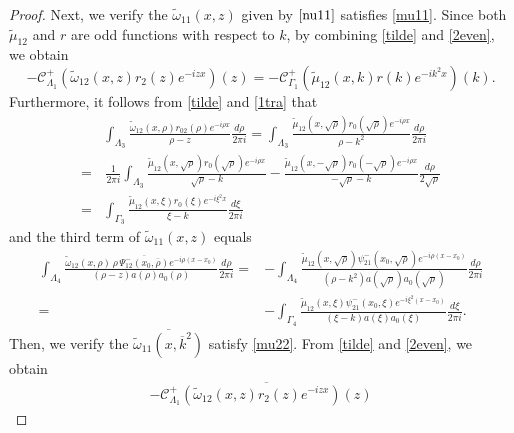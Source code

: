 \documentclass[preprint,compress,12pt]{elsarticle}
\numberwithin{equation}{section}
\begin{document}
\begin{proof}
Next, we verify the $\tilde{\omega}_{11}(x,z)$ given by $\eqref{nu11}$ satisfies \eqref{mu11}. Since both $\tilde{\mu}_{12}$ and $r$ are odd functions with respect to $k$, by combining \eqref{tilde} and \eqref{2even}, we obtain
\begin{equation*}
-\mathcal{C}_{\Lambda_{1}}^{+}\left(\tilde{\omega}_{12}(x,z)r_{2}(z)e^{-izx}\right)(z)
=-\mathcal{C}_{\Gamma_{1}}^{+}(\tilde{\mu}_{12}(x,k)r(k)e^{-ik^{2}x})(k).
\end{equation*}
Furthermore, it follows from \eqref{tilde} and \eqref{1tra} that
\begin{equation*}
\begin{aligned}
&\int_{\Lambda_{3}}\frac{\tilde{\omega}_{12}(x,\rho)r_{02}(\rho)e^{-i\rho x}}{\rho-z}\frac{d\rho}{2\pi i}
=\int_{\Lambda_{3}}\frac{\tilde{\mu}_{12}(x,\sqrt{\rho})r_{0}(\sqrt{\rho})e^{-i\rho x}}{\rho-k^{2}}\frac{d\rho }{2\pi i}\\
=&\,\frac{1}{2\pi i}\int_{\Lambda_{3}}\frac{\tilde{\mu}_{12}(x,\sqrt{\rho})r_{0}(\sqrt{\rho})e^{-i\rho x}}{\sqrt{\rho}-k}-\frac{\tilde{\mu}_{12}(x,-\sqrt{\rho})r_{0}(-\sqrt{\rho})e^{-i\rho x}}{-\sqrt{\rho}-k}\frac{d\rho }{2\sqrt{\rho}}\\
=&\int_{\Gamma_{3}}\frac{\tilde{\mu}_{12}(x,\xi)r_{0}(\xi)e^{-i\xi^{2} x}}{\xi-k}\frac{d\xi}{2\pi i}
\end{aligned}
\end{equation*}
and the third term of $\tilde{\omega}_{11}(x,z)$ equals
\begin{equation*}
\begin{aligned}
\int_{\Lambda_{4}}\frac{\tilde{\omega}_{12}(x,\rho)\,\rho\, \overline{\Psi_{12}^{-}(x_{0},\overline{\rho})} e^{-i\rho (x-x_{0})}}{(\rho-z)a(\rho)a_{0}(\rho)}\frac{d\rho}{2\pi i}
=&-\int_{\Lambda_{4}}\frac{\tilde{\mu}_{12}(x,\sqrt{\rho})\psi_{21}^{-}(x_{0},\sqrt{\rho}) e^{-i\rho (x-x_{0})}}{(\rho-k^{2})a(\sqrt{\rho})a_{0}(\sqrt{\rho})}\frac{d\rho}{2\pi i}\\
=&-\int_{\Gamma_{4}}\frac{\tilde{\mu}_{12}(x,\xi)\psi_{21}^{-}(x_{0},\xi) e^{-i\xi^{2} (x-x_{0})}}{(\xi-k)a(\xi)a_{0}(\xi)}\frac{d\xi}{2\pi i}.
\end{aligned}
\end{equation*}
Then, we verify the $\overline{\tilde{\omega}_{11}(x,\overline{k}^{2})}$ satisfy \eqref{mu22}. From \eqref{tilde} and \eqref{2even}, we obtain
\begin{equation*}
\begin{aligned}
-\overline{\mathcal{C}_{\Lambda_{1}}^{+}\left(\tilde{\omega}_{12}(x,z)r_{2}(z)e^{-izx}\right)(z)}

\end{aligned}
\end{equation*}
\end{proof}
\end{document}
